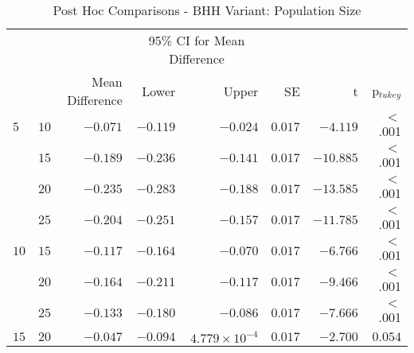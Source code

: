 \begin{table}[H]
	\centering
	\caption{Post Hoc Comparisons - BHH Variant: Population Size}
	\label{tab:results:population:post_hoc}%
	\par\bigskip
	\resizebox{0.9\textwidth}{!}
	{
		\begin{tabular}{lrrrrrrr}
			\toprule
			\multicolumn{1}{c}{} & \multicolumn{1}{c}{} & \multicolumn{1}{c}{} & \multicolumn{2}{c}{95\% CI for Mean Difference} & \multicolumn{1}{c}{} & \multicolumn{1}{c}{} & \multicolumn{1}{c}{}               \\
			\cline{4-5}
			$ $                  & $ $                  & Mean Difference      & Lower                                           & Upper                & SE                   & t                    & p$_{tukey}$ \\
			\cmidrule[0.4pt]{1-8}
			$5$                  & $10$                 & $-0.071$             & $-0.119$                                        & $-0.024$             & $0.017$              & $-4.119$             & $<$ .001    \\
			$ $                  & $15$                 & $-0.189$             & $-0.236$                                        & $-0.141$             & $0.017$              & $-10.885$            & $<$ .001    \\
			                     & $20$                 & $-0.235$             & $-0.283$                                        & $-0.188$             & $0.017$              & $-13.585$            & $<$ .001    \\
			                     & $25$                 & $-0.204$             & $-0.251$                                        & $-0.157$             & $0.017$              & $-11.785$            & $<$ .001    \\
			$10$                 & $15$                 & $-0.117$             & $-0.164$                                        & $-0.070$             & $0.017$              & $-6.766$             & $<$ .001    \\
			$ $                  & $20$                 & $-0.164$             & $-0.211$                                        & $-0.117$             & $0.017$              & $-9.466$             & $<$ .001    \\
			                     & $25$                 & $-0.133$             & $-0.180$                                        & $-0.086$             & $0.017$              & $-7.666$             & $<$ .001    \\
			$15$                 & $20$                 & $-0.047$             & $-0.094$                                        & $4.779\times10^{-4}$ & $0.017$              & $-2.700$             & $0.054$     \\

\end{tabular}}
\end{table}
